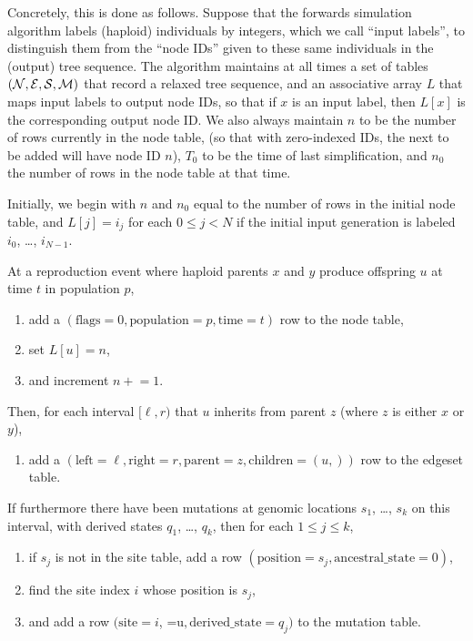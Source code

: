 \documentclass{article}
\begin{document}
Concretely, this is done as follows.
Suppose that the forwards simulation algorithm labels (haploid) individuals by integers,
which we call ``input labels'', 
to distinguish them from the ``node IDs'' given to these same individuals in the (output) tree sequence.
The algorithm maintains at all times a set of tables $(\mathcal{N}, \mathcal{E}, \mathcal{S}, \mathcal{M})$
that record a relaxed tree sequence,
and an associative array $L$ that maps input labels to output node IDs, so that if $x$ is an input label,
then $L[x]$ is the corresponding output node ID.
We also always maintain $n$ to be the number of rows currently in the node table,
(so that with zero-indexed IDs, the next to be added will have node ID $n$),
$T_0$ to be the time of last simplification,
and $n_0$ the number of rows in the node table at that time. 

Initially, we begin with $n$ and $n_0$ equal to the number of rows in the initial node table,
and $L[j] = i_j$ for each $0 \le j < N$ if the initial input generation is labeled
$i_0$, \ldots, $i_{N-1}$.

At a reproduction event where haploid parents $x$ and $y$ produce offspring $u$ 
at time $t$ in population $p$,
\begin{enumerate}
    \item add a 
        $(
        \text{flags}=0,
        \text{population}=p, 
        \text{time}=t)$ row to the node table,
    \item set $L[u] = n$,
    \item and increment $n\mathrel{+}=1$.
\end{enumerate}
Then, for each interval $[\ell,r)$ that $u$ inherits from parent $z$
(where $z$ is either $x$ or $y$),
\begin{enumerate}[resume]
    \item add a 
        $( \text{left}=\ell,
        \text{right}=r, 
        \text{parent}=z, 
        \text{children}=(u,))$ row to the edgeset table.
\end{enumerate}
If furthermore there have been mutations at genomic locations $s_1$, \ldots, $s_k$
on this interval,
with derived states $q_1$, \ldots, $q_k$,
then for each $1 \le j \le k$,
\begin{enumerate}[resume]
    \item if $s_j$ is not in the site table, add a row
        $( \text{position}=s_j,
        \text{ancestral\_state}=0)$,
    \item find the site index $i$ whose position is $s_j$,
    \item and add a row
        $( \text{site}=i$,
           =u$,
        \text{derived\_state}=q_j)$ to the mutation table.
\end{enumerate}
\end{document}
